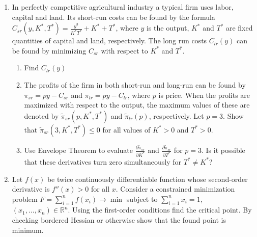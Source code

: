 \documentclass[12pt,a4paper]{article}
\begin{document}
\begin{enumerate}[resume]
\item In perfectly competitive agricultural industry a typical firm uses labor, capital and land. Its short-run costs can be found by the formula $C_{sr}(y,K^*,T^*)=\frac{y^3}{K^*T^*}+K^*+T^*$, where $y$  is the output, $K^*$  and $T^*$  are fixed quantities of capital and land, respectively.
The long run costs $C_{lr}(y)$ can be found by minimizing $C_{sr}$ with respect to $K^*$  and $T^*$.
\begin{enumerate} 
\item Find  $C_{lr}(y)$
\item The profits of the firm in both short-run and long-run can be found by $\pi_{sr}=py-C_{sr}$  and   $\pi_{lr}=py-C_{lr}$, where $p$ is price. When the profits are maximized with respect to the output, the maximum values of these are denoted by $\tilde{\pi}_{sr}(p,K^*,T^*)$ and $\tilde{\pi}_{lr}(p)$, respectively. Let $p=3$. Show that $\tilde{\pi}_{sr}(3,K^*,T^*) \leq 0$ for all values of  $K^*>0$  and  $T^*>0$. 
\item Use Envelope Theorem to evaluate $\frac{\partial \tilde{\pi}_{sr}}{\partial K^*}$ and $\frac{\partial \tilde{\pi}_{sr}}{\partial T^*}$ for $p=3$. Is it possible that these derivatives turn zero simultaneously for $T^* \neq K^*$?
\end{enumerate}

\item Let $f(x)$ be twice continuously differentiable function whose second-order derivative is $f''(x)>0$ for all $x$. Consider a constrained minimization problem $F=\sum_{i=1}^n f(x_i) \to \min$ 
subject to $\sum_{i=1}^n x_i = 1$,  $(x_1, \ldots, x_n)\in \mathbb{R}^n$. Using the first-order conditions find the critical point. By checking bordered Hessian or otherwise show that the found point is minimum.
\end{enumerate}
\end{document}
